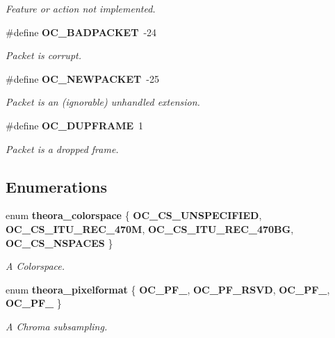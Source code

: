 \begin{CompactItemize}
\begin{CompactList}\small\item\em Feature or action not implemented. \item\end{CompactList}\item 
\#define {\bf OC\_\-BADPACKET}~-24\label{theora_8h_36091b71b428f52454e363463ef6e445}

\begin{CompactList}\small\item\em Packet is corrupt. \item\end{CompactList}\item 
\#define {\bf OC\_\-NEWPACKET}~-25\label{theora_8h_efea777076ff2a9004b418415edba208}

\begin{CompactList}\small\item\em Packet is an (ignorable) unhandled extension. \item\end{CompactList}\item 
\#define {\bf OC\_\-DUPFRAME}~1\label{theora_8h_a4e82ad9e3a51af2f9659f2eb353170e}

\begin{CompactList}\small\item\em Packet is a dropped frame. \item\end{CompactList}\end{CompactItemize}
\subsection*{Enumerations}
\begin{CompactItemize}
\item 
enum {\bf theora\_\-colorspace} \{ {\bf OC\_\-CS\_\-UNSPECIFIED}, 
{\bf OC\_\-CS\_\-ITU\_\-REC\_\-470M}, 
{\bf OC\_\-CS\_\-ITU\_\-REC\_\-470BG}, 
{\bf OC\_\-CS\_\-NSPACES}
 \}
\begin{CompactList}\small\item\em A Colorspace. \item\end{CompactList}\item 
enum {\bf theora\_\-pixelformat} \{ {\bf OC\_\-PF\_}, 
{\bf OC\_\-PF\_\-RSVD}, 
{\bf OC\_\-PF\_}, 
{\bf OC\_\-PF\_}
 \}
\begin{CompactList}\small\item\em A Chroma subsampling. \item\end{CompactList}\end{CompactItemize}
